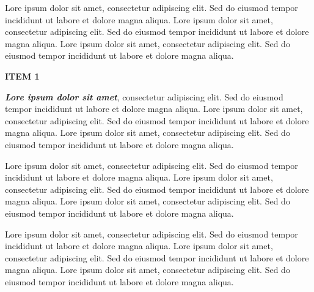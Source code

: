 \documentclass[11pt,a4paper]{article}
\newenvironment{twocolumns}
    {\begin{multicols*}{2}}
    {\end{multicols*}}
\newcommand{\hfour}[1]{%
    \needspace{4\baselineskip}%
    \vspace*{3pt}%
    {\fontsize{10pt}{11pt}\selectfont\bfseries
    \raisebox{-0.1ex}{\textcolor{gray!60}{\rule{1.5ex}{1.5ex}}}\hspace{0.45em}%
    \MakeTextUppercase{#1}%
    \par}%
    \nopagebreak[4]%
    \vspace{3pt}%
}
\begin{document}
\begin{twocolumns}
Lore ipsum dolor sit amet, consectetur adipiscing elit. Sed do eiusmod
tempor incididunt ut labore et dolore magna aliqua. Lore ipsum dolor sit
amet, consectetur adipiscing elit. Sed do eiusmod tempor incididunt ut
labore et dolore magna aliqua. Lore ipsum dolor sit amet, consectetur
adipiscing elit. Sed do eiusmod tempor incididunt ut labore et dolore
magna aliqua.

\hypertarget{item-1}{\hfour{Item 1}\label{item-1}}

\textbf{\emph{Lore ipsum dolor sit amet}}, consectetur adipiscing elit.
Sed do eiusmod tempor incididunt ut labore et dolore magna aliqua. Lore
ipsum dolor sit amet, consectetur adipiscing elit. Sed do eiusmod tempor
incididunt ut labore et dolore magna aliqua. Lore ipsum dolor sit amet,
consectetur adipiscing elit. Sed do eiusmod tempor incididunt ut labore
et dolore magna aliqua.

Lore ipsum dolor sit amet, consectetur adipiscing elit. Sed do eiusmod
tempor incididunt ut labore et dolore magna aliqua. Lore ipsum dolor sit
amet, consectetur adipiscing elit. Sed do eiusmod tempor incididunt ut
labore et dolore magna aliqua. Lore ipsum dolor sit amet, consectetur
adipiscing elit. Sed do eiusmod tempor incididunt ut labore et dolore
magna aliqua.


Lore ipsum dolor sit amet, consectetur adipiscing elit. Sed do eiusmod
tempor incididunt ut labore et dolore magna aliqua. Lore ipsum dolor sit
amet, consectetur adipiscing elit. Sed do eiusmod tempor incididunt ut
labore et dolore magna aliqua. Lore ipsum dolor sit amet, consectetur
adipiscing elit. Sed do eiusmod tempor incididunt ut labore et dolore
magna aliqua.
\end{twocolumns}
\end{document}
